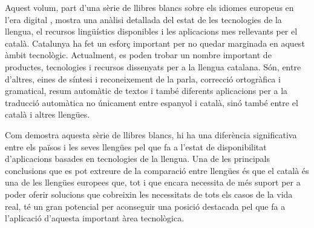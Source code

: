 \begin{multicols}{2}
Aquest volum, part d’una sèrie de llibres blancs sobre els idiomes europeus en l’era digital \cite{Meta1}, mostra una anàlisi detallada del estat de les tecnologies de la llengua, el recursos lingüístics disponibles i les aplicacions mes rellevants per el català. Catalunya ha fet un esforç important per no quedar marginada en aquest àmbit tecnològic. Actualment, es poden trobar un nombre important de productes, tecnologies i recursos dissenyats per a la llengua catalana. Són, entre d’altres, eines de síntesi i reconeixement de la parla, correcció ortogràfica i gramatical, resum automàtic de textos i també diferents aplicacions per a la traducció automàtica no únicament entre espanyol i català, sinó també entre el català i altres llengües. 

Com demostra aquesta sèrie de llibres blancs, hi ha una diferència significativa entre els països i les seves llengües pel que fa a l’estat de disponibilitat d’aplicacions basades en tecnologies de la llengua. Una de les principals conclusions que es pot extreure de la comparació entre llengües és que el català és una de les llengües europees que, tot i que encara necessita de més suport per a poder oferir solucions que cobreixin les necessitats de tots els casos de la vida real, té un gran potencial per aconseguir una posició destacada pel que fa a l’aplicació d’aquesta important àrea tecnològica. 
\end{multicols}

\clearpage



